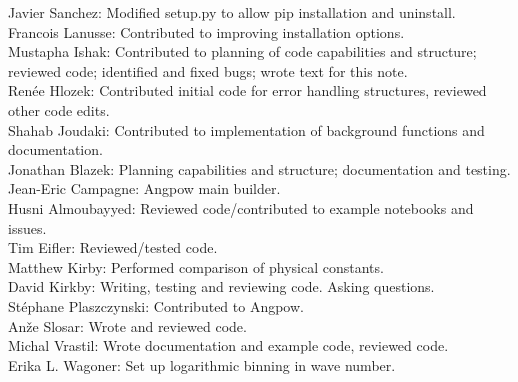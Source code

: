 Javier Sanchez: Modified setup.py to allow pip installation and uninstall. \\
Francois Lanusse: Contributed to improving installation options. \\
Mustapha Ishak: Contributed to planning of code capabilities and structure; reviewed code; identified and fixed bugs; wrote text for this note. \\
Ren\'ee Hlozek: Contributed initial code for error handling structures, reviewed other code edits. \\
Shahab Joudaki: Contributed to implementation of background functions and documentation. \\
Jonathan Blazek: Planning capabilities and structure; documentation and testing. \\
Jean-Eric Campagne: Angpow main builder. \\
Husni Almoubayyed: Reviewed code/contributed to example notebooks and issues. \\
Tim Eifler: Reviewed/tested code. \\
Matthew Kirby: Performed comparison of physical constants. \\
David Kirkby: Writing, testing and reviewing code. Asking questions. \\
St\'ephane Plaszczynski: Contributed to Angpow. \\
An\v{z}e Slosar: Wrote and reviewed code. \\
Michal Vrastil: Wrote documentation and example code, reviewed code. \\
Erika L. Wagoner: Set up logarithmic binning in wave number. \\
